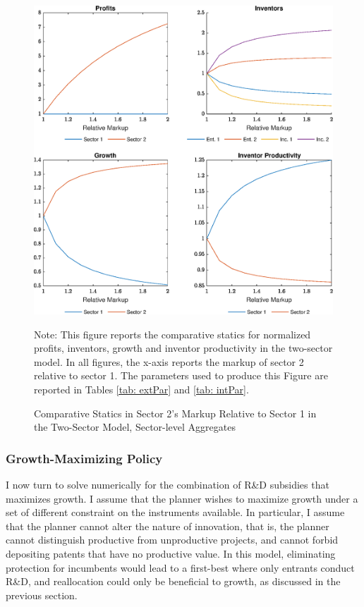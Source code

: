 \begin{figure}[th]
\begin{centering}
\caption{Comparative Statics in Sector 2's Markup Relative to Sector 1 in the
Two-Sector Model, Sector-level Aggregates \label{fig:TwoSecSectors}}
\includegraphics[width=1\textwidth]{graphs/GE_sectors}
\par\end{centering}
\raggedright{}{\small{}Note: This figure reports the comparative statics
for normalized profits, inventors, growth and inventor productivity
in the two-sector model. In all figures, the x-axis reports the markup
of sector 2 relative to sector 1. The parameters used to produce this
Figure are reported in Tables \ref{tab: extPar} and \ref{tab: intPar}.}{\small\par}
\end{figure}
\FloatBarrier

\subsubsection{Growth-Maximizing Policy}

I now turn to solve numerically for the combination of R\&D subsidies
that maximizes growth. I assume that the planner wishes to maximize
growth under a set of different constraint on the instruments available.
In particular, I assume that the planner cannot alter the nature of
innovation, that is, the planner cannot distinguish productive from
unproductive projects, and cannot forbid depositing patents that have
no productive value. In this model, eliminating protection for incumbents
would lead to a first-best where only entrants conduct R\&D, and reallocation
could only be beneficial to growth, as discussed in the previous section. 


